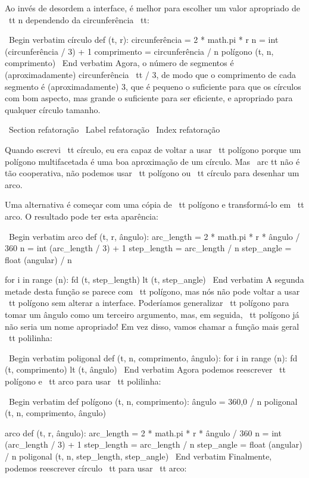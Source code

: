 \documentclass[10pt]{book}
\begin{document}
{Ao invés de desordem a interface, é melhor
para escolher um valor apropriado de {\ tt n}
dependendo da circunferência {\ tt}:

\ Begin {verbatim}
círculo def (t, r):
    circunferência = 2 * math.pi * r
    n = int (circunferência / 3) + 1
    comprimento = circunferência / n
    polígono (t, n, comprimento)
\ End {verbatim}
%
Agora, o número de segmentos é (aproximadamente) {circunferência \ tt / 3},
de modo que o comprimento de cada segmento é (aproximadamente) 3, que é pequeno
o suficiente para que os círculos com bom aspecto, mas grande o suficiente para ser eficiente,
e apropriado para qualquer círculo tamanho.


\ Section {} refatoração
\ Label {} refatoração
\ Index {} refatoração

Quando escrevi {\ tt círculo}, eu era capaz de voltar a usar {\ tt polígono}
porque um polígono multifacetada é uma boa aproximação de um círculo.
Mas {\ arc tt} não é tão cooperativa, não podemos usar {\ tt polígono}
ou {\ tt círculo} para desenhar um arco.

Uma alternativa é começar com uma cópia
de {\ tt polígono} e transformá-lo em {\ tt arco}. O resultado
pode ter esta aparência:

\ Begin {verbatim}
arco def (t, r, ângulo):
    arc_length = 2 * math.pi * r * ângulo / 360
    n = int (arc_length / 3) + 1
    step_length = arc_length / n
    step_angle = float (angular) / n
    
    for i in range (n):
        fd (t, step_length)
        lt (t, step_angle)
\ End {verbatim}
%
A segunda metade desta função se parece com {\ tt polígono}, mas nós
não pode voltar a usar {\ tt polígono} sem alterar a interface. Poderíamos
generalizar {\ tt polígono} para tomar um ângulo como um terceiro argumento,
mas, em seguida, {\ tt polígono} já não seria um nome apropriado!
Em vez disso, vamos chamar a função mais geral {\ tt polilinha}:

\ Begin {verbatim}
poligonal def (t, n, comprimento, ângulo):
    for i in range (n):
        fd (t, comprimento)
        lt (t, ângulo)
\ End {verbatim}
%
Agora podemos reescrever {\ tt polígono} e {\ tt arco} para usar {\ tt polilinha}:

\ Begin {verbatim}
def polígono (t, n, comprimento):
    ângulo = 360,0 / n
    poligonal (t, n, comprimento, ângulo)

arco def (t, r, ângulo):
    arc_length = 2 * math.pi * r * ângulo / 360
    n = int (arc_length / 3) + 1
    step_length = arc_length / n
    step_angle = float (angular) / n
    poligonal (t, n, step_length, step_angle)
\ End {verbatim}
%
Finalmente, podemos reescrever {círculo \ tt} para usar {\ tt arco}:

}
\end{document}
